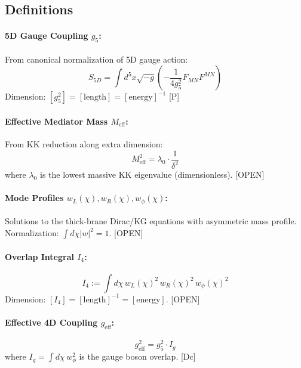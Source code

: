 \documentclass[11pt]{article}
\newcommand{\tagDc}{{\small\textsf{[Dc]}}}
\newcommand{\tagP}{{\small\textsf{[P]}}}
\newcommand{\tagOPEN}{{\small\textsf{[OPEN]}}}
\begin{document}
\subsection{Definitions}

\paragraph{5D Gauge Coupling $g_5$:}
From canonical normalization of 5D gauge action:
\begin{equation}
    S_{5D} = \int d^5x \sqrt{-g} \left( -\frac{1}{4g_5^2} F_{MN}F^{MN} \right)
\end{equation}
Dimension: $[g_5^2] = [\text{length}] = [\text{energy}]^{-1}$ \tagP{}

\paragraph{Effective Mediator Mass $M_{\text{eff}}$:}
From KK reduction along extra dimension:
\begin{equation}
    M_{\text{eff}}^2 = \lambda_0 \cdot \frac{1}{\delta^2}
\end{equation}
where $\lambda_0$ is the lowest massive KK eigenvalue (dimensionless). \tagOPEN{}

\paragraph{Mode Profiles $w_L(\chi), w_R(\chi), w_\phi(\chi)$:}
Solutions to the thick-brane Dirac/KG equations with asymmetric mass profile.
Normalization: $\int d\chi |w|^2 = 1$. \tagOPEN{}

\paragraph{Overlap Integral $I_4$:}
\begin{equation}
    I_4 := \int d\chi \, w_L(\chi)^2 \, w_R(\chi)^2 \, w_\phi(\chi)^2
    \label{eq:I4_def}
\end{equation}
Dimension: $[I_4] = [\text{length}]^{-1} = [\text{energy}]$. \tagOPEN{}

\paragraph{Effective 4D Coupling $g_{\text{eff}}$:}
\begin{equation}
    g_{\text{eff}}^2 = g_5^2 \cdot I_g
\end{equation}
where $I_g = \int d\chi \, w_\phi^2$ is the gauge boson overlap. \tagDc{}
\end{document}
